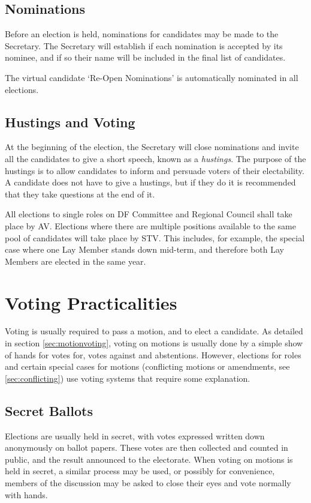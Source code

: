 \documentclass[a4paper, 11pt]{article} %
\begin{document}
\subsection{Nominations}
Before an election is held, nominations for candidates may be made to the Secretary.  The Secretary will establish if each nomination is accepted by its nominee, and if so their name will be included in the final list of candidates.

The virtual candidate `Re-Open Nominations' is automatically nominated in all elections.

\subsection{Hustings and Voting}
At the beginning of the election, the Secretary will close nominations and invite all the candidates to give a short speech, known as a \emph{hustings}.  The purpose of the hustings is to allow candidates to inform and persuade voters of their electability.  A candidate does not have to give a hustings, but if they do it is recommended that they take questions at the end of it.

All elections to single roles on DF Committee and Regional Council shall take place by AV.  Elections where there are multiple positions available to the same pool of candidates will take place by STV.  This includes, for example, the special case where one Lay Member stands down mid-term, and therefore both Lay Members are elected in the same year.

\section{Voting Practicalities}
Voting is usually required to pass a motion, and to elect a candidate.  As detailed in section \ref{sec:motionvoting}, voting on motions is usually done by a simple show of hands for votes for, votes against and abstentions.  However, elections for roles and certain special cases for motions (conflicting motions or amendments, see \ref{sec:conflicting}) use voting systems that require some explanation.

\subsection{Secret Ballots}
Elections are usually held in secret, with votes expressed written down anonymously on ballot papers.  These votes are then collected and counted in public, and the result announced to the electorate.  When voting on motions is held in secret, a similar process may be used, or possibly for convenience, members of the discussion may be asked to close their eyes and vote normally with hands.
\end{document}
